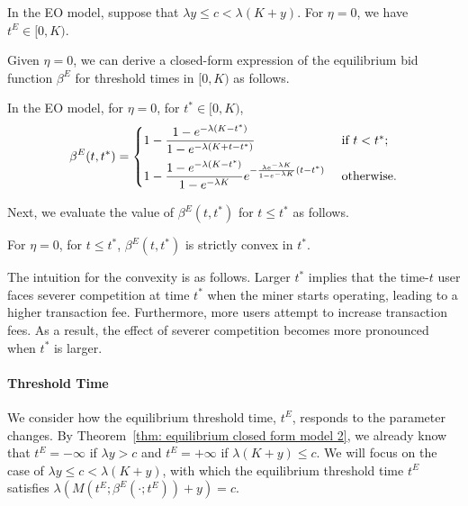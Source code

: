 \documentclass[12pt, letterpaper]{article}
\begin{document}
\begin{lem}\label{lem: tE in 0 K}
    In the EO model, suppose that $\lambda y \le c < \lambda (K + y)$. For $\eta = 0$, we have $t^E \in [0, K)$.
\end{lem}




Given $\eta = 0$, we can derive a closed-form expression of the equilibrium bid function $\beta^E$ for threshold times in $[0,K)$ as follows.

\begin{lem}\label{thm: model 2 beta function limit}
    In the EO model, for $\eta = 0$, for $t^* \in [0, K)$,
    \begin{equation}
        \beta^E(t, t^*) = \begin{cases}
            1 - \dfrac{1 - e^{-\lambda(K - t^*)}}{1 - e^{-\lambda(K + t - t^*)}} & \text{ if } t < t^*;\vspace{0.5em}\\
            1 - \dfrac{1 - e^{-\lambda(K - t^*)}}{1 - e^{-\lambda K}} e^{- \frac{\lambda e^{- \lambda K}}{1 - e^{- \lambda K}}(t -t^*)} & \text{ otherwise.}
        \end{cases}
    \end{equation}
\end{lem}



Next, we evaluate the value of $\beta^E(t, t^*)$ for $t \le t^*$ as follows.
\begin{lem}\label{lem: beta increasing in tstar}
    For $\eta = 0$, for $t \le t^*$, $\beta^E(t, t^*)$ is strictly convex in $t^*$.
\end{lem}

The intuition for the convexity is as follows.
Larger $t^*$ implies that the time-$t$ user faces severer competition at time $t^*$ when the miner starts operating, leading to a higher transaction fee. Furthermore,  more users attempt to increase transaction fees. As a result, the effect of severer competition becomes more pronounced when $t^*$ is larger. 









\paragraph{Threshold Time}

We consider how the equilibrium threshold time, $t^E$, responds to the parameter changes. By Theorem~\ref{thm: equilibrium closed form model 2}, we already know that $t^E = - \infty$ if $\lambda y > c$ and $t^E = + \infty$ if $\lambda (K + y) \le c$. We will focus on the case of $\lambda y \le c < \lambda (K + y)$, with which the equilibrium threshold time $t^E$ satisfies $\lambda (M(t^E; \beta^E(\cdot; t^E)) + y) = c$.
\end{document}
